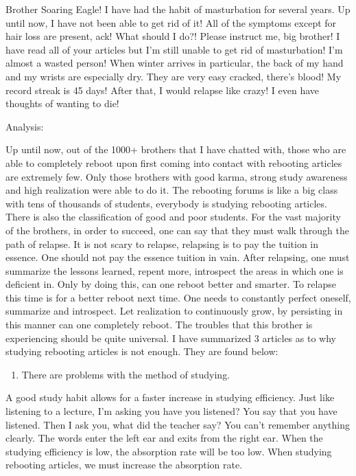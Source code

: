 \documentclass[
]{book}
\providecommand{\tightlist}{%
  \setlength{\itemsep}{0pt}\setlength{\parskip}{0pt}}
\begin{document}
Brother Soaring Eagle! I have had the habit of masturbation for several years. Up until now, I have not been able to get rid of it! All of the symptoms except for hair loss are present, ack! What should I do?! Please instruct me, big brother! I have read all of your articles but I'm still unable to get rid of masturbation! I'm almost a wasted person! When winter arrives in particular, the back of my hand and my wrists are especially dry. They are very easy cracked, there's blood! My record streak is 45 days! After that, I would relapse like crazy! I even have thoughts of wanting to die!

Analysis:

Up until now, out of the 1000+ brothers that I have chatted with, those who are able to completely reboot upon first coming into contact with rebooting articles are extremely few. Only those brothers with good karma, strong study awareness and high realization were able to do it. The rebooting forums is like a big class with tens of thousands of students, everybody is studying rebooting articles. There is also the classification of good and poor students.
For the vast majority of the brothers, in order to succeed, one can say that they must walk through the path of relapse. It is not scary to relapse, relapsing is to pay the tuition in essence. One should not pay the essence tuition in vain. After relapsing, one must summarize the lessons learned, repent more, introspect the areas in which one is deficient in. Only by doing this, can one reboot better and smarter. To relapse this time is for a better reboot next time. One needs to constantly perfect oneself, summarize and introspect. Let realization to continuously grow, by persisting in this manner can one completely reboot. The troubles that this brother is experiencing should be quite universal. I have summarized 3 articles as to why studying rebooting articles is not enough. They are found below:

\begin{enumerate}
\def\labelenumi{(\arabic{enumi})}
\tightlist
\item
  There are problems with the method of studying.
\end{enumerate}

A good study habit allows for a faster increase in studying efficiency. Just like listening to a lecture, I'm asking you have you listened? You say that you have listened. Then I ask you, what did the teacher say? You can't remember anything clearly. The words enter the left ear and exits from the right ear. When the studying efficiency is low, the absorption rate will be too low. When studying rebooting articles, we must increase the absorption rate.
\end{document}
